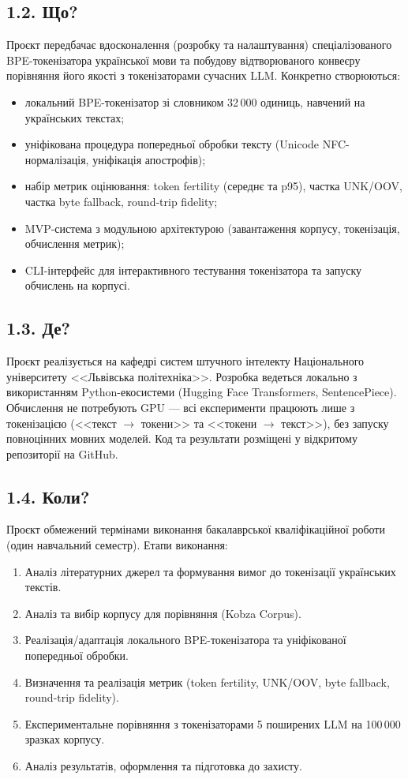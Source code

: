 \documentclass[14pt]{extarticle}
\begin{document}
\subsection*{1.2. Що?}

Проєкт передбачає вдосконалення (розробку та налаштування) спеціалізованого BPE-токенізатора української мови та побудову відтворюваного конвеєру порівняння його якості з токенізаторами сучасних LLM. Конкретно створюються:
\begin{itemize}
  \item локальний BPE-токенізатор зі словником 32\,000 одиниць, навчений на українських текстах;
  \item уніфікована процедура попередньої обробки тексту (Unicode NFC-нормалізація, уніфікація апострофів);
  \item набір метрик оцінювання: token fertility (середнє та p95), частка UNK/OOV, частка byte fallback, round-trip fidelity;
  \item MVP-система з модульною архітектурою (завантаження корпусу, токенізація, обчислення метрик);
  \item CLI-інтерфейс для інтерактивного тестування токенізатора та запуску обчислень на корпусі.
\end{itemize}

\subsection*{1.3. Де?}

Проєкт реалізується на кафедрі систем штучного інтелекту Національного університету <<Львівська політехніка>>. Розробка ведеться локально з використанням Python-екосистеми (Hugging Face Transformers, SentencePiece). Обчислення не потребують GPU --- всі експерименти працюють лише з токенізацією (<<текст $\to$ токени>> та <<токени $\to$ текст>>), без запуску повноцінних мовних моделей. Код та результати розміщені у відкритому репозиторії на GitHub.

\subsection*{1.4. Коли?}

Проєкт обмежений термінами виконання бакалаврської кваліфікаційної роботи (один навчальний семестр). Етапи виконання:
\begin{enumerate}
  \item Аналіз літературних джерел та формування вимог до токенізації українських текстів.
  \item Аналіз та вибір корпусу для порівняння (Kobza Corpus).
  \item Реалізація/адаптація локального BPE-токенізатора та уніфікованої попередньої обробки.
  \item Визначення та реалізація метрик (token fertility, UNK/OOV, byte fallback, round-trip fidelity).
  \item Експериментальне порівняння з токенізаторами 5 поширених LLM на 100\,000 зразках корпусу.
  \item Аналіз результатів, оформлення та підготовка до захисту.
\end{enumerate}
\end{document}
